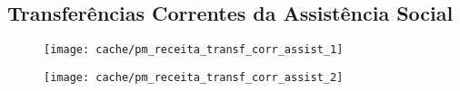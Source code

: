 
\subsection{Transferências Correntes da Assistência Social}





\begin{figure}[H]
\center
\texttt{[image: cache/pm\_receita\_transf\_corr\_assist\_1]}
\end{figure}

\begin{figure}[H]
\center
\texttt{[image: cache/pm\_receita\_transf\_corr\_assist\_2]}
\end{figure}
